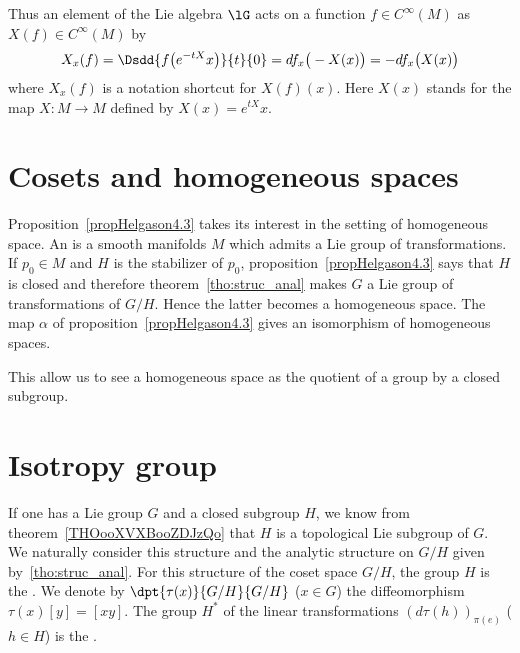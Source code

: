Thus an element of the Lie algebra \( \lG\) acts on a function \( f\in C^{\infty}(M)\) as \( X(f)\in C^{\infty}(M)\) by
\begin{equation}        \label{EQooQDLAooZXnWta}
	X_x(f)=\Dsdd{ f\big(  e^{-tX}x \big) }{t}{0}=df_x\big( -X(x) \big)=-df_x\big( X(x) \big)
\end{equation}
where \( X_x(f)\) is a notation shortcut for \( X(f)(x)\). Here \( X(x)\) stands for the map \( X\colon M\to M\) defined by \( X(x)= e^{tX}x\).

\section{Cosets and homogeneous spaces}

Proposition~\ref{propHelgason4.3} takes its interest in the setting of homogeneous space. An  is a smooth manifolds $M$ which admits a Lie group of transformations. If $p_{0}\in M$ and $H$ is the stabilizer of $p_{0}$, proposition~\ref{propHelgason4.3} says that $H$ is closed and therefore theorem~\ref{tho:struc_anal} makes $G$ a Lie group of transformations of $G/H$. Hence the latter becomes a homogeneous space. The map $\alpha$ of proposition~\ref{propHelgason4.3} gives an isomorphism of homogeneous spaces.

This allow us to see a homogeneous space as the quotient of a group by a closed subgroup.

\section{Isotropy group}

If one has a Lie group $G$ and a closed subgroup $H$, we know from theorem~\ref{THOooXVXBooZDJzQo} that $H$ is a topological Lie subgroup of $G$. We naturally consider this structure and the analytic structure on $G/H$ given by~\ref{tho:struc_anal}. For this structure of the coset space $G/H$, the group $H$ is the . We denote by $\dpt{\tau(x)}{G/H}{G/H}$ ($x\in G$) the diffeomorphism $\tau(x)[y]=[xy]$. The group $H^*$ of the linear transformations $(d\tau(h))_{\pi(e)}$ ($h\in H$) is the .


